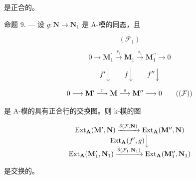 是正合的。

命题 9. --- 设 \(g: \mathbf{N} \to \mathbf{N}_1\) 是 A-模的同态，且

\[
(\mathcal {F} _ {1})
\]

\[
0 \longrightarrow \mathbf {M} _ {1} ^ {\prime} \xrightarrow {r _ {1}} \mathbf {M} _ {1} \xrightarrow {s _ {1}} \mathbf {M} _ {1} ^ {\prime \prime} \longrightarrow 0
\]

\[
f ^ {\prime} \Big \downarrow \qquad f \Big \downarrow \qquad f ^ {\prime \prime} \Big \downarrow
\]

\[
0 \longrightarrow \mathbf {M} ^ {\prime} \stackrel {r} {\longrightarrow} \mathbf {M} \stackrel {s} {\longrightarrow} \mathbf {M} ^ {\prime \prime} \longrightarrow 0\tag{$(\mathcal{F})$}
\]

是 A-模的具有正合行的交换图。则 k-模的图

\[
\begin{array}{c} \operatorname{Ext} _ {\mathbf {A}} (\mathbf {M} ^ {\prime}, \mathbf {N}) \xrightarrow {\delta (\mathcal {F} , \mathbf {N})} \operatorname{Ext} _ {\mathbf {A}} (\mathbf {M} ^ {\prime \prime}, \mathbf {N}) \\ \operatorname{Ext} _ {\mathbf {A}} (f ^ {\prime}, g) \Big \downarrow \\ \operatorname{Ext} _ {\mathbf {A}} (\mathbf {M} _ {1} ^ {\prime}, \mathbf {N} _ {1}) \xrightarrow {\delta (\mathcal {F} _ {1} , \mathbf {N} _ {1})} \operatorname{Ext} _ {\mathbf {A}} (\mathbf {M} _ {1} ^ {\prime \prime}, \mathbf {N} _ {1}) \end{array}
\]

是交换的。

